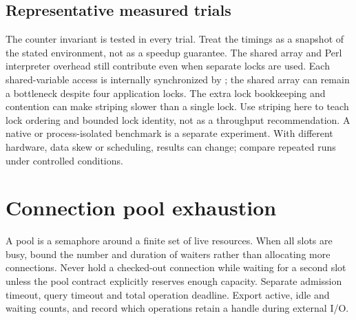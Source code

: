 \subsection{Representative measured trials}
The counter invariant is tested in every trial. Treat the timings as a
snapshot of the stated environment, not as a speedup guarantee. The shared
array and Perl interpreter overhead still contribute even when separate
locks are used. Each shared-variable access is internally synchronized by
; the shared array can remain a bottleneck despite
four application locks. The extra lock bookkeeping and contention can
make striping slower than a single lock. Use striping here to teach lock
ordering and bounded lock identity, not as a throughput recommendation.
A native or process-isolated benchmark is a separate experiment. With different hardware, data skew or scheduling, results
can change; compare repeated runs under controlled conditions.
\section{Connection pool exhaustion}
A pool is a semaphore around a finite set of live resources. When all
slots are busy, bound the number and duration of waiters rather than
allocating more connections. Never hold a checked-out connection while
waiting for a second slot unless the pool contract explicitly reserves
enough capacity. Separate admission timeout, query timeout and total
operation deadline. Export active, idle and waiting counts, and record
which operations retain a handle during external I/O.
